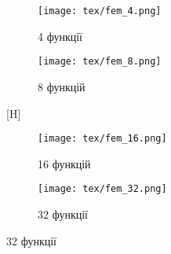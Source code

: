 \begin{figure}[H]
    \begin{subfigure}{.5\textwidth}
    \centering
    \texttt{[image: tex/fem\_4.png]}
    \caption{4 функції}
    \end{subfigure}
    \hfill
    \begin{subfigure}{.5\textwidth}
    \centering
    \texttt{[image: tex/fem\_8.png]}
    \caption{8 функцій}
    \end{subfigure}
\begin{figure}[H]

\end{figure}[H]
    \begin{subfigure}{.5\textwidth}
    \centering
    \texttt{[image: tex/fem\_16.png]}
    \caption{16 функцій}
    \end{subfigure}
    \hfill
    \begin{subfigure}{.5\textwidth}
    \centering
    \texttt{[image: tex/fem\_32.png]}
    \caption{32 функції}
    \end{subfigure}
\end{figure}


